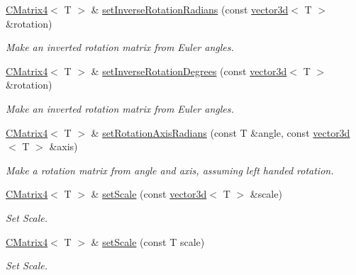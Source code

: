 \begin{DoxyCompactItemize}
\hyperlink{classirr_1_1core_1_1CMatrix4}{C\+Matrix4}$<$ T $>$ \& \hyperlink{classirr_1_1core_1_1CMatrix4_a78fd2ee43a622062169762e093813311}{set\+Inverse\+Rotation\+Radians} (const \hyperlink{classirr_1_1core_1_1vector3d}{vector3d}$<$ T $>$ \&rotation)
\begin{DoxyCompactList}\small\item\em Make an inverted rotation matrix from Euler angles. \end{DoxyCompactList}\item 
\hyperlink{classirr_1_1core_1_1CMatrix4}{C\+Matrix4}$<$ T $>$ \& \hyperlink{classirr_1_1core_1_1CMatrix4_abf572f53301bb5d00ceeec9f170aff92}{set\+Inverse\+Rotation\+Degrees} (const \hyperlink{classirr_1_1core_1_1vector3d}{vector3d}$<$ T $>$ \&rotation)
\begin{DoxyCompactList}\small\item\em Make an inverted rotation matrix from Euler angles. \end{DoxyCompactList}\item 
\hyperlink{classirr_1_1core_1_1CMatrix4}{C\+Matrix4}$<$ T $>$ \& \hyperlink{classirr_1_1core_1_1CMatrix4_ac00a1c59a2a499ad2f1e97f12d03998a}{set\+Rotation\+Axis\+Radians} (const T \&angle, const \hyperlink{classirr_1_1core_1_1vector3d}{vector3d}$<$ T $>$ \&axis)
\begin{DoxyCompactList}\small\item\em Make a rotation matrix from angle and axis, assuming left handed rotation. \end{DoxyCompactList}\item 
\mbox{\label{classirr_1_1core_1_1CMatrix4_acdb815ec8f28876d1732cd2483027596}} 
\hyperlink{classirr_1_1core_1_1CMatrix4}{C\+Matrix4}$<$ T $>$ \& \hyperlink{classirr_1_1core_1_1CMatrix4_acdb815ec8f28876d1732cd2483027596}{set\+Scale} (const \hyperlink{classirr_1_1core_1_1vector3d}{vector3d}$<$ T $>$ \&scale)
\begin{DoxyCompactList}\small\item\em Set Scale. \end{DoxyCompactList}\item 
\mbox{\label{classirr_1_1core_1_1CMatrix4_a18af980e2bc3575f60576b6d4b4cc0f3}} 
\hyperlink{classirr_1_1core_1_1CMatrix4}{C\+Matrix4}$<$ T $>$ \& \hyperlink{classirr_1_1core_1_1CMatrix4_a18af980e2bc3575f60576b6d4b4cc0f3}{set\+Scale} (const T scale)
\begin{DoxyCompactList}\small\item\em Set Scale. \end{DoxyCompactList}\item 

\end{DoxyCompactItemize}
